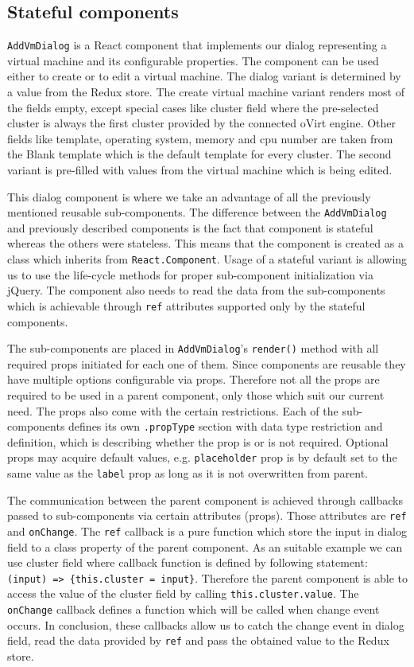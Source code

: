 \subsection{Stateful components}
\texttt{AddVmDialog} is a React component that implements our dialog representing a virtual machine and its configurable properties. The component can be used either to create or to edit a virtual machine. The dialog variant is determined by a value from the Redux store. The create virtual machine variant renders most of the fields empty, except special cases like cluster field where the pre-selected cluster is always the first cluster provided by the connected oVirt engine. Other fields like template, operating system, memory and cpu number are taken from the Blank template which is the default template for every cluster. The second variant is pre-filled with values from the virtual machine which is being edited.
 
This dialog component is where we take an advantage of all the previously mentioned reusable sub-components. The difference between the \texttt{AddVmDialog} and previously described components is the fact that component is stateful whereas the others were stateless. This means that the component is created as a class which inherits from \texttt{React.Component}. Usage of a stateful variant is allowing us to use the life-cycle methods for proper sub-component initialization via jQuery. The component also needs to read the data from the sub-components which is achievable through \texttt{ref} attributes supported only by the stateful components.

The sub-components are placed in \texttt{AddVmDialog}'s \texttt{render()} method with all required props initiated for each one of them. Since components are reusable they have multiple options configurable via props. Therefore not all the props are required to be used in a parent component, only those which suit our current need. The props also come with the certain restrictions. Each of the sub-components defines its own \texttt{.propType} section with data type restriction and definition, which is describing whether the prop is or is not required. Optional props may acquire default values, e.g. \texttt{placeholder} prop is by default set to the same value as the \texttt{label} prop as long as it is not overwritten from parent.

The communication between the parent component is achieved through callbacks passed to sub-components via certain attributes (props). Those attributes are \texttt{ref} and \texttt{onChange}. The \texttt{ref} callback is a pure function which store the input in dialog field to a class property of the parent component. As an suitable example we can use cluster field where callback function is defined by following statement: \texttt{(input) => \{this.cluster = input\}}. Therefore the parent component is able to access the value of the cluster field by calling \texttt{this.cluster.value}. The \texttt{onChange} callback defines a function which will be called when change event occurs. In conclusion, these callbacks allow us to catch the change event in dialog field, read the data provided by \texttt{ref} and pass the obtained value to the Redux store.

